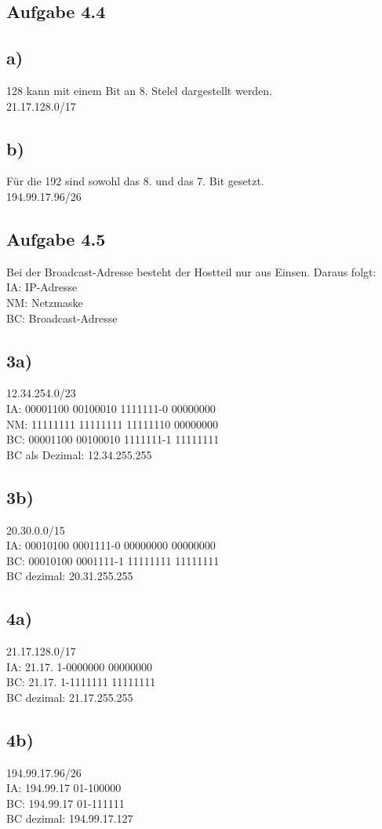 \documentclass{article}
\begin{document}
	\subsection*{Aufgabe 4.4}
	\subsection*{a)}
	128 kann mit einem Bit an 8. Stelel dargestellt werden. \\
	21.17.128.0/17
	\subsection*{b)}
	Für die 192 sind sowohl das 8. und das 7. Bit gesetzt. \\
	194.99.17.96/26
	\subsection*{Aufgabe 4.5}
	Bei der Broadcast-Adresse besteht der Hostteil nur aus Einsen. Daraus folgt: \\
	IA: IP-Adresse \\
	NM: Netzmaske \\
	BC: Broadcast-Adresse
	\subsection*{3a)}
	12.34.254.0/23 \\
	IA: 00001100 00100010 1111111-0 00000000 \\
	NM: 11111111 11111111 11111110 00000000 \\
	BC: 00001100 00100010 1111111-1 11111111 \\
	BC als Dezimal: 12.34.255.255
	\subsection*{3b)}
	20.30.0.0/15 \\
	IA: 00010100 0001111-0 00000000 00000000 \\
	BC: 00010100 0001111-1 11111111 11111111 \\
	BC dezimal: 20.31.255.255 
	\subsection*{4a)}
	21.17.128.0/17 \\
	IA: 21.17. 1-0000000 00000000 \\
	BC: 21.17. 1-1111111 11111111 \\
	BC dezimal: 21.17.255.255
	\subsection*{4b)}
	194.99.17.96/26 \\
	IA: 194.99.17 01-100000 \\
	BC: 194.99.17 01-111111 \\
	BC dezimal: 194.99.17.127
\end{document}
